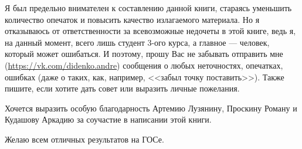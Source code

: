 Я был предельно внимателен к составлению данной книги, стараясь уменьшить количество опечаток и повысить качество излагаемого материала. Но я отказываюсь от ответственности за всевозможные недочеты в этой книге, ведь я, на данный момент, всего лишь студент 3-ого курса, а главное --- человек, который может ошибаться. И поэтому, прошу Вас не забывать отправить мне (\url{https://vk.com/didenko.andre}) сообщения о любых неточностях, опечатках, ошибках (даже о таких, как, например, <<забыл точку поставить>>). Также пишите, если хотите дать совет или выразить личные пожелания. 

Хочется выразить особую благодарность Артемию Лузянину, Проскину Роману и Кудашову Аркадию за соучастие в написании этой книги.
 
\vspace*{\baselineskip}
Желаю всем отличных результатов на ГОСе.